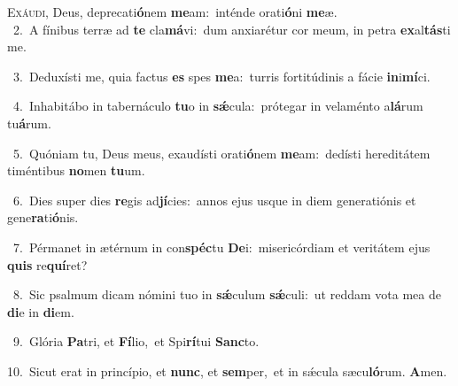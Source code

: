 \lettrine{\initial\textcolor{\initialcolor}{E}}{xáudi,} Deus, deprecati\-\textbf{ó}\-nem \textbf{me}\-am:~\star inténde orati\-\textbf{ó}\-ni \textbf{me}\-æ.\\
{\numbfont\textcolor{\numbcolor}{~2.}}~A fínibus terræ ad \textbf{te} cla\-\textbf{má}\-vi:~\star dum anxiarétur cor meum, in petra \textbf{ex}\-al\-\textbf{tás}\-ti me.\par
{\numbfont\textcolor{\numbcolor}{~3.}}~Deduxísti me, quia factus \textbf{es} spes \textbf{me}\-a:~\star turris fortitúdinis a fácie \textbf{in}\-i\-\textbf{mí}\-ci.\par
{\numbfont\textcolor{\numbcolor}{~4.}}~Inhabitábo in tabernáculo \textbf{tu}\-o in \textbf{sǽ}\-cula:~\star prótegar in velaménto a\-\textbf{lá}\-rum tu\-\textbf{á}\-rum.\par
{\numbfont\textcolor{\numbcolor}{~5.}}~Quóniam tu, Deus meus, exaudísti orati\-\textbf{ó}\-nem \textbf{me}\-am:~\star dedísti hereditátem timéntibus \textbf{no}\-men \textbf{tu}\-um.\par
{\numbfont\textcolor{\numbcolor}{~6.}}~Dies super dies \textbf{re}\-gis ad\-\textbf{jí}\-cies:~\star annos ejus usque in diem generatiónis et gene\-\textbf{ra}\-ti\-\textbf{ó}\-nis.\par
{\numbfont\textcolor{\numbcolor}{~7.}}~Pérmanet in ætérnum in con\-\textbf{spéc}\-tu \textbf{De}\-i:~\star misericórdiam et veritátem ejus \textbf{quis} re\-\textbf{quí}\-ret?\par
{\numbfont\textcolor{\numbcolor}{~8.}}~Sic psalmum dicam nómini tuo in \textbf{sǽ}\-culum \textbf{sǽ}\-culi:~\star ut reddam vota mea de \textbf{di}\-e in \textbf{di}\-em.\par
{\numbfont\textcolor{\numbcolor}{~9.}}~Glória \textbf{Pa}\-tri, et \textbf{Fí}\-lio,~\star et Spi\-\textbf{rí}\-tui \textbf{Sanc}\-to.\par
{\numbfont\textcolor{\numbcolor}{10.}}~Sicut erat in princípio, et \textbf{nunc}\-, et \textbf{sem}\-per,~\star et in sǽcula sæcu\-\textbf{ló}\-rum. \textbf{A}\-men.\par
